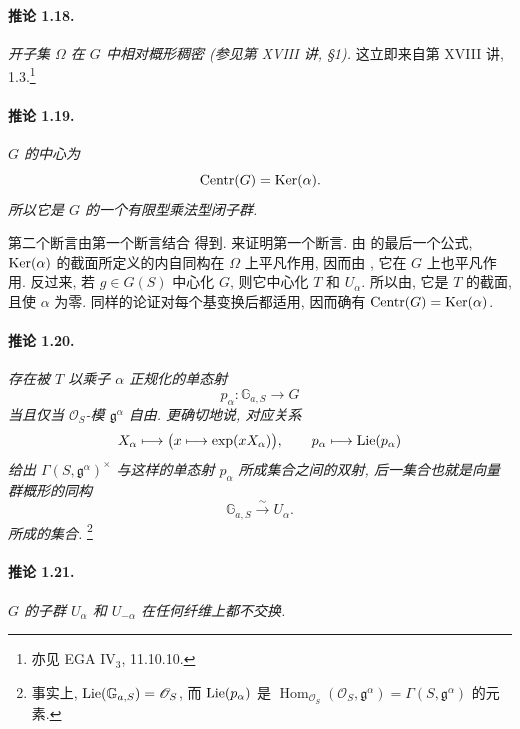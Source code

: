 \paragraph{\textbf{推论 1.18.}}
\emph{开子集 \(\Omega\) 在 \(G\) 中相对概形稠密 \textup{(参见第 XVIII 讲, \S1)}.}
这立即来自第 XVIII 讲, 1.3.\footnote{亦见 EGA IV\(_3\), 11.10.10.}

\paragraph{\textbf{推论 1.19.}}
\emph{\(G\) 的中心为}
\[
  \operatorname{Centr}(G)=\operatorname{Ker}(\alpha).
\]
\emph{所以它是 \(G\) 的一个有限型乘法型闭子群.}

第二个断言由第一个断言结合 得到. 来证明第一个断言. 由  的最后一个公式, \(\operatorname{Ker}(\alpha)\) 的截面所定义的内自同构在 \(\Omega\) 上平凡作用, 因而由 , 它在 \(G\) 上也平凡作用. 反过来, 若 \(g\in G(S)\) 中心化 \(G\), 则它中心化 \(T\) 和 \(U_\alpha\). 所以由, 它是 \(T\) 的截面, 且使 \(\alpha\) 为零. 同样的论证对每个基变换后都适用, 因而确有 \(\operatorname{Centr}(G)=\operatorname{Ker}(\alpha)\).

\paragraph{\textbf{推论 1.20.}}
\emph{存在被 \(T\) 以乘子 \(\alpha\) 正规化的单态射
\[
  p_\alpha\colon\mathbb G_{a,S}\longrightarrow G
\]
当且仅当 \(\mathscr O_S\)-模 \(\mathfrak g^\alpha\) 自由. 更确切地说, 对应关系}
\[
  X_\alpha\longmapsto
    \bigl(x\longmapsto\exp(xX_\alpha)\bigr),
  \qquad
  p_\alpha\longmapsto\operatorname{Lie}(p_\alpha)
\]
\emph{给出 \(\Gamma(S,\mathfrak g^\alpha)^\times\) 与这样的单态射 \(p_\alpha\) 所成集合之间的双射, 后一集合也就是向量群概形的同构}
\[
  \mathbb G_{a,S}\xrightarrow{\sim}U_\alpha.
\]
\emph{所成的集合.}
\footnote{事实上, \(\operatorname{Lie}(\mathbb G_{a,S})=\mathscr O_S\), 而 \(\operatorname{Lie}(p_\alpha)\) 是 \(\operatorname{Hom}_{\mathscr O_S}(\mathscr O_S,\mathfrak g^\alpha)=\Gamma(S,\mathfrak g^\alpha)\) 的元素.}

\paragraph{\textbf{推论 1.21.}}
\emph{\(G\) 的子群 \(U_\alpha\) 和 \(U_{-\alpha}\) 在任何纤维上都不交换.}

